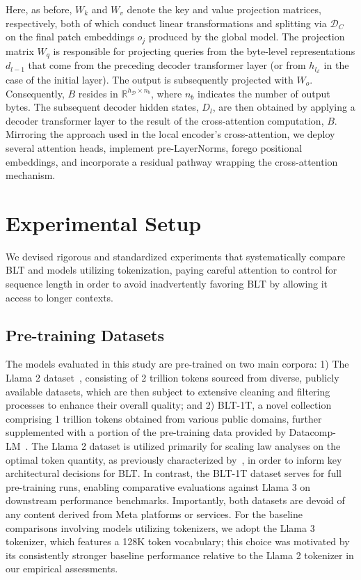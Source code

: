 Here, as before, $W_k$ and $W_v$ denote the key and value projection matrices, respectively, both of which conduct linear transformations and splitting via $\mathcal{D}_C$ on the final patch embeddings $o_j$ produced by the global model. The projection matrix $W_q$ is responsible for projecting queries from the byte-level representations $d_{l-1}$ that come from the preceding decoder transformer layer (or from $h_{l_{\mathcal{E}}}$ in the case of the initial layer). The output is subsequently projected with $W_o$. Consequently, $B$ resides in $\mathbb{R}^{h_{\mathcal{D}} \times n_b}$, where $n_b$ indicates the number of output bytes. The subsequent decoder hidden states, $D_l$, are then obtained by applying a decoder transformer layer to the result of the cross-attention computation, $B$. Mirroring the approach used in the local encoder's cross-attention, we deploy several attention heads, implement pre-LayerNorms, forego positional embeddings, and incorporate a residual pathway wrapping the cross-attention mechanism.

\section{Experimental Setup}
\label{section:experiments}
We devised rigorous and standardized experiments that systematically compare {\textsc BLT} and models utilizing tokenization, paying careful attention to control for sequence length in order to avoid inadvertently favoring {\textsc BLT} by allowing it access to longer contexts.

\subsection{Pre-training Datasets}  
The models evaluated in this study are pre-trained on two main corpora: 1) The Llama 2 dataset~\citep{touvron2023llama}, consisting of 2 trillion tokens sourced from diverse, publicly available datasets, which are then subject to extensive cleaning and filtering processes to enhance their overall quality; and 2) {\textsc BLT}-1T, a novel collection comprising 1 trillion tokens obtained from various public domains, further supplemented with a portion of the pre-training data provided by Datacomp-LM~\citep{li2024datacomp}. The Llama 2 dataset is utilized primarily for scaling law analyses on the optimal token quantity, as previously characterized by~\cite{dubey2024llama}, in order to inform key architectural decisions for {\textsc BLT}. In contrast, the {\textsc BLT}-1T dataset serves for full pre-training runs, enabling comparative evaluations against Llama 3 on downstream performance benchmarks. Importantly, both datasets are devoid of any content derived from Meta platforms or services. For the baseline comparisons involving models utilizing tokenizers, we adopt the Llama 3 tokenizer, which features a 128K token vocabulary; this choice was motivated by its consistently stronger baseline performance relative to the Llama 2 tokenizer in our empirical assessments.

